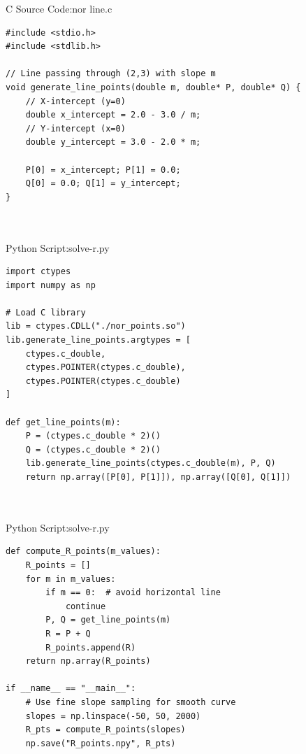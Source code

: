 \documentclass{beamer}
\numberwithin{equation}{section}
\theoremstyle{remark}
\begin{document}
\begin{frame}[fragile]{C Source Code:nor line.c}
\begin{verbatim}
#include <stdio.h>
#include <stdlib.h>

// Line passing through (2,3) with slope m
void generate_line_points(double m, double* P, double* Q) {
    // X-intercept (y=0)
    double x_intercept = 2.0 - 3.0 / m;
    // Y-intercept (x=0)
    double y_intercept = 3.0 - 2.0 * m;

    P[0] = x_intercept; P[1] = 0.0;
    Q[0] = 0.0; Q[1] = y_intercept;
}



\end{verbatim}
\end{frame}

\begin{frame}[fragile]{Python Script:solve-r.py}
\begin{verbatim}
import ctypes
import numpy as np

# Load C library
lib = ctypes.CDLL("./nor_points.so")
lib.generate_line_points.argtypes = [
    ctypes.c_double,
    ctypes.POINTER(ctypes.c_double),
    ctypes.POINTER(ctypes.c_double)
]

def get_line_points(m):
    P = (ctypes.c_double * 2)()
    Q = (ctypes.c_double * 2)()
    lib.generate_line_points(ctypes.c_double(m), P, Q)
    return np.array([P[0], P[1]]), np.array([Q[0], Q[1]])



\end{verbatim}
\end{frame}
\begin{frame}[fragile]{Python Script:solve-r.py}
\begin{verbatim}
def compute_R_points(m_values):
    R_points = []
    for m in m_values:
        if m == 0:  # avoid horizontal line
            continue
        P, Q = get_line_points(m)
        R = P + Q
        R_points.append(R)
    return np.array(R_points)

if __name__ == "__main__":
    # Use fine slope sampling for smooth curve
    slopes = np.linspace(-50, 50, 2000)
    R_pts = compute_R_points(slopes)
    np.save("R_points.npy", R_pts)

\end{verbatim}
\end{frame}
\end{document}
